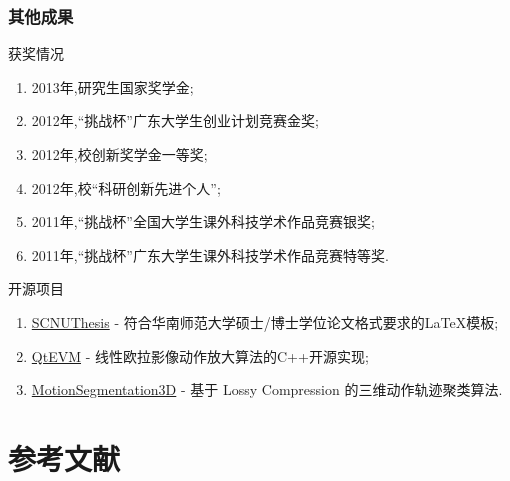 \documentclass[xcolor=svgnames,serif,table]{beamer}
\begin{document}
\begin{frame}
  \frametitle{其他成果}
  \begin{block}{获奖情况}
    \scriptsize\sffamily
    \begin{enumerate}
    \item 2013年,研究生国家奖学金;
    \item 2012年,“挑战杯”广东大学生创业计划竞赛金奖;
    \item 2012年,校创新奖学金一等奖;
    \item 2012年,校“科研创新先进个人”;
    \item 2011年,“挑战杯”全国大学生课外科技学术作品竞赛银奖;
    \item 2011年,“挑战杯”广东大学生课外科技学术作品竞赛特等奖.
    \end{enumerate}
  \end{block}
  \pause
  \begin{block}{开源项目}
    \scriptsize\sffamily
    \begin{enumerate}
    \item \href{http://github.com/wzpan/scnuthesis}{SCNUThesis} - 符合华南师范大学硕士/博士学位论文格式要求的\LaTeX 模板;
    \item \href{http://github.com/wzpan/QtEVM}{QtEVM} - 线性欧拉影像动作放大算法的C++开源实现;
    \item \href{http://github.com/wzpan/MotionSegmentation3D}{MotionSegmentation3D} - 基于 Lossy Compression 的三维动作轨迹聚类算法.
    \end{enumerate}
  \end{block}
\end{frame}

\section*{参考文献}
\end{document}
